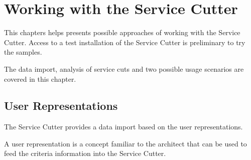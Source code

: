 \chapter{Working with the Service Cutter} 

This chapters helps presents possible approaches of working with the Service Cutter. Access to a test installation of the Service Cutter is preliminary to try the samples.

The data import, analysis of service cuts and two possible usage scenarios are covered in this chapter.









\section{User Representations}
\label{sec:dataImport}

The Service Cutter provides a data import based on the user representations.

A user representation is a concept familiar to the architect that can be used to feed the criteria information into the Service Cutter. 

